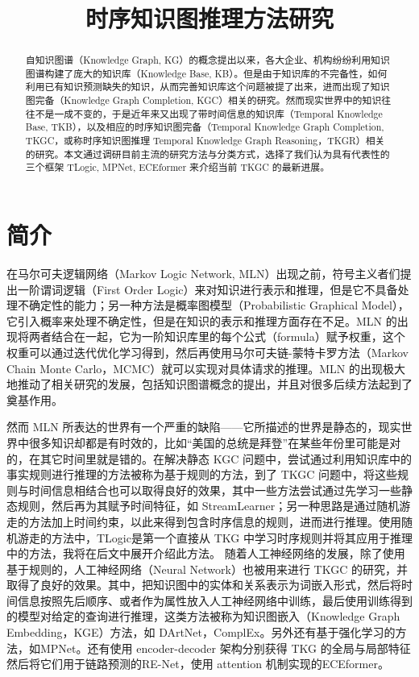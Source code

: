 \documentclass[a4paper, AutoFakeBold]{article}
\begin{document}
\title{时序知识图推理方法研究}


\begin{abstract}
自知识图谱（Knowledge Graph, KG）的概念提出以来，各大企业、机构纷纷利用知识图谱构建了庞大的知识库（Knowledge Base, KB）。但是由于知识库的不完备性，如何利用已有知识预测缺失的知识，从而完善知识库这个问题被提了出来，进而出现了知识图完备（Knowledge Graph Completion, KGC）相关的研究。然而现实世界中的知识往往不是一成不变的，于是近年来又出现了带时间信息的知识库（Temporal Knowledge Base, TKB），以及相应的时序知识图完备\cite{2023survey}（Temporal Knowledge Graph Completion, TKGC，或称时序知识图推理\cite{7-2021} Temporal Knowledge Graph Reasoning，TKGR）相关的研究。本文通过调研目前主流的研究方法与分类方式，选择了我们认为具有代表性的三个框架 TLogic, MPNet, ECEformer 来介绍当前 TKGC 的最新进展。
\end{abstract}

\section{简介}

在马尔可夫逻辑网络（Markov Logic Network, MLN）出现之前，符号主义者们提出一阶谓词逻辑（First Order Logic）来对知识进行表示和推理，但是它不具备处理不确定性的能力；另一种方法是概率图模型（Probabilistic Graphical Model），它引入概率来处理不确定性，但是在知识的表示和推理方面存在不足。MLN 的出现将两者结合在一起，它为一阶知识库里的每个公式（formula）赋予权重，这个权重可以通过迭代优化学习得到，然后再使用马尔可夫链-蒙特卡罗方法\cite{20-1996}（Markov Chain Monte Carlo，MCMC）就可以实现对具体请求的推理\cite{2006mln}。MLN 的出现极大地推动了相关研究的发展，包括知识图谱概念的提出\cite{8-2024}，并且对很多后续方法起到了奠基作用。

然而 MLN 所表达的世界有一个严重的缺陷——它所描述的世界是静态的，现实世界中很多知识却都是有时效的，比如“美国的总统是拜登”在某些年份里可能是对的，在其它时间里就是错的。在解决静态 KGC 问题中，尝试通过利用知识库中的事实规则进行推理的方法被称为基于规则的方法，到了 TKGC 问题中，将这些规则与时间信息相结合也可以取得良好的效果，其中一些方法尝试通过先学习一些静态规则，然后再为其赋予时间特征，如 StreamLearner\cite{11-2019}；另一种思路是通过随机游走的方法加上时间约束，以此来得到包含时序信息的规则，进而进行推理。使用随机游走的方法中，TLogic\cite{3-2022RefBlue}是第一个直接从 TKG 中学习时序规则并将其应用于推理中的方法，我将在后文中展开介绍此方法。
随着人工神经网络的发展，除了使用基于规则的，人工神经网络（Neural Network）也被用来进行 TKGC 的研究，并取得了良好的效果。其中，把知识图中的实体和关系表示为词嵌入形式，然后将时间信息按照先后顺序、或者作为属性放入人工神经网络中训练，最后使用训练得到的模型对给定的查询进行推理，这类方法被称为知识图嵌入（Knowledge Graph Embedding，KGE）方法，如 DArtNet\cite{5-2020}，ComplEx\cite{21-2016}。另外还有基于强化学习的方法，如MPNet\cite{4-2024RefBlue}。还有使用 encoder-decoder 架构分别获得 TKG 的全局与局部特征然后将它们用于链路预测的RE-Net\cite{12-2020RefBlue}，使用 attention\cite{10-2023RefBlue} 机制实现的ECEformer\cite{6-2024RefBlue}。
\end{document}
